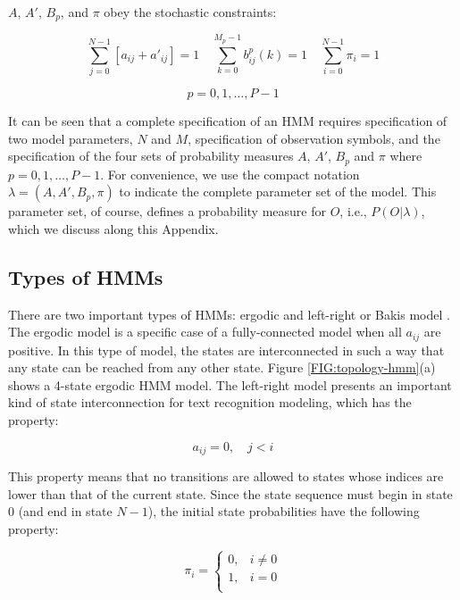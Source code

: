 \documentclass{article}[14pt, oneside, a4paper, times]
\begin{document}
$A$, $A'$, $B_p$, and $\pi$ obey the stochastic constraints:

\begin{equation}
    \sum_{j=0}^{N-1} [a_{ij} + a'_{ij} ] = 1
        \quad \sum_{k=0}^{M_p-1} b_{ij}^p(k) = 1
        \quad \sum_{i=0}^{N-1} \pi_i = 1
    \label{EQ:constraints-hmms}
\end{equation}

$$p = 0, 1, \ldots, P-1$$

It can be seen that a complete specification of an HMM requires specification
of two model parameters, $N$ and $M$, specification of observation symbols, and
the specification of the four sets of probability measures $A$, $A'$, $B_p$ and
$\pi$ where $p = 0, 1, \ldots, P-1$. For convenience, we use the compact
notation $\lambda = (A, A', B_p, \pi)$ to indicate the complete parameter set
of the model. This parameter set, of course, defines a probability measure for
$O$, i.e., $P(O |\lambda)$, which we discuss along this Appendix.


\subsection{Types of HMMs}

There are two important types of HMMs: ergodic and left-right or Bakis model
\cite{Rabiner89}. The ergodic model is a specific case of a fully-connected
model when all $a_{ij}$ are positive. In this type of model, the states are
interconnected in such a way that any state can be reached from any other
state. Figure \ref{FIG:topology-hmm}(a) shows a 4-state ergodic HMM model. The
left-right model presents an important kind of state interconnection for text
recognition modeling, which has the property:

\begin{equation}
    a_{ij} = 0,\quad j < i
    \label{EQ:left-right-hmm}
\end{equation}

This property means that no transitions are allowed to states whose indices are
lower than that of the current state. Since the state sequence must begin in
state $0$ (and end in state $N-1$), the initial state probabilities have the
following property:

\begin{equation}
\pi_i = \left \{ \begin{array}{ll}
     0, & i \neq 0 \\
     1, & i = 0 \\
     \end{array}
     \right.
\label{eq11-hmm}
\end{equation}
\end{document}
